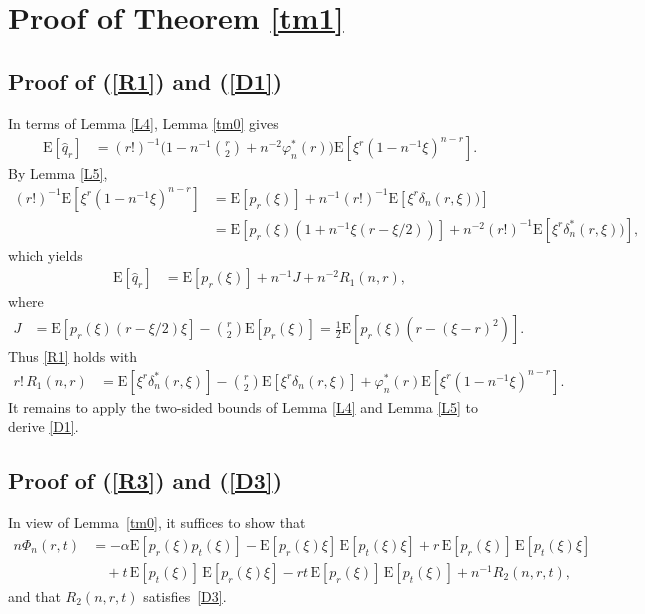 \documentclass[12]{article}
\newcommand{\rE}{\mathrm{E}} %
\begin{document}
\section{Proof of Theorem \ref{tm1}}\label{PR2}


\subsection*{Proof of  (\ref{R1}) and (\ref{D1})}

In terms of Lemma \ref{L4}, Lemma \ref{tm0} gives
\begin{align*}
 \rE[\hat q_r]&=(r!)^{-1}\Big(1-n^{-1}\binom{r}{2}+n^{-2}\varphi^*_n(r)\Big)\rE[\xi^r(1-n^{-1}\xi)^{n-r}].
\end{align*}
By  Lemma \ref{L5},
\begin{align*}
(r!)^{-1}\rE[\xi^r(1-n^{-1}\xi)^{n-r}]&=\rE[p_{r}(\xi)]+n^{-1}(r!)^{-1}\rE[\xi^r\delta_n(r,\xi))]\\
&=\rE[p_{r}(\xi)(1+n^{-1}\xi(r-\xi/2))]+n^{-2}(r!)^{-1}\rE[\xi^r\delta^*_n(r,\xi))],
\end{align*}
which yields
\begin{align*}
 \rE[\hat q_r]&=\rE[p_{r}(\xi)]+n^{-1}J+n^{-2} R_1(n,r),
\end{align*}
where 
\begin{align*}
J&=\rE[p_{r}(\xi)(r-\xi/2)\xi]-\binom{r}{2}\rE[p_{r}(\xi)]=\frac{1}{2}\rE[p_{r}(\xi)(r-(\xi-r)^2)].
\end{align*}
Thus \eqref{R1} holds with
\begin{align*}%
r!\, R_1(n,r)&=\rE[\xi^r\delta^*_n(r,\xi)]-\binom{r}{2}\rE[\xi^r\delta_n(r,\xi)]+\varphi^*_n(r)\rE[\xi^r(1-n^{-1}\xi)^{n-r}].
\end{align*}
It remains to apply the two-sided bounds of Lemma \ref{L4} and  Lemma \ref{L5} to derive \eqref{D1}.


 
\subsection*{Proof of  (\ref{R3}) and (\ref{D3})}
In view of Lemma~\ref{tm0}, it suffices to show that
\begin{align}\label{sist}
n\Phi_n(r,t)
&= -\alpha \rE[p_{r}(\xi)p_{t}(\xi)]
   - \rE[p_{r}(\xi)\xi]\,\rE[p_{t}(\xi)\xi]    + r\,\rE[p_{r}(\xi)]\,\rE[p_{t}(\xi)\xi] \\
&\quad + t\,\rE[p_{t}(\xi)]\, \rE[p_{r}(\xi)\xi] - rt\,\rE[p_{r}(\xi)]\,\rE[p_{t}(\xi)]
   + n^{-1}R_2(n,r,t), \nonumber
\end{align}
and that $R_2(n,r,t)$ satisfies~\eqref{D3}.
\end{document}
